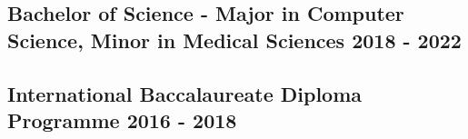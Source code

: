 \documentclass[letter,10pt]{article}
\begin{document}
\subsection{{Bachelor of Science - Major in Computer Science, Minor in Medical Sciences \hfill 2018 - 2022}}

\vspace{1.25em}

\subsection{{International Baccalaureate Diploma Programme \hfill 2016 - 2018}}

\vspace{1.25em}
\end{document}
